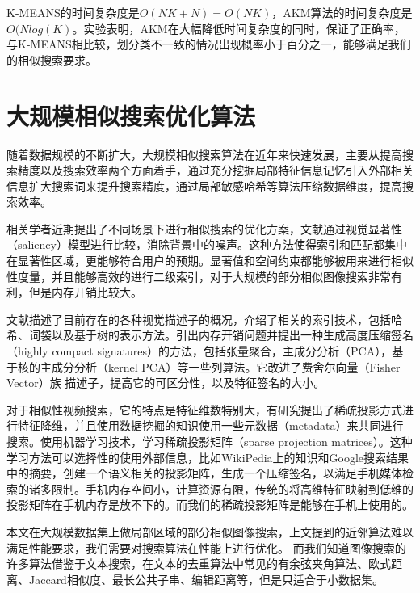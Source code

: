 K-MEANS的时间复杂度是\(O(NK+N) = O(NK)\)，AKM算法的时间复杂度是\(O(Nlog(K)\)。实验表明，AKM在大幅降低时间复杂度的同时，保证了正确率，与K-MEANS相比较，划分类不一致的情况出现概率小于百分之一，能够满足我们的相似搜索要求。




\section{大规模相似搜索优化算法}

随着数据规模的不断扩大，大规模相似搜索算法在近年来快速发展，主要从提高搜索精度以及搜索效率两个方面着手，通过充分挖掘局部特征信息记忆引入外部相关信息扩大搜索词来提升搜索精度，通过局部敏感哈希等算法压缩数据维度，提高搜索效率\cite{POLICY:2013te}。

相关学者近期提出了不同场景下进行相似搜索的优化方案，文献\cite{Li:2013ks}通过视觉显著性（saliency）模型进行比较，消除背景中的噪声。这种方法使得索引和匹配都集中在显著性区域，更能够符合用户的预期。显著值和空间约束都能够被用来进行相似性度量，并且能够高效的进行二级索引，对于大规模的部分相似图像搜索非常有利，但是内存开销比较大。

文献\cite{Negrel:2013ur}描述了目前存在的各种视觉描述子的概况，介绍了相关的索引技术，包括哈希、词袋以及基于树的表示方法。引出内存开销问题并提出一种生成高度压缩签名（highly compact signatures）的方法，包括张量聚合，主成分分析（PCA），基于核的主成分分析（kernel PCA）等一些列算法。它改进了费舍尔向量（Fisher Vector）族 描述子，提高它的可区分性，以及特征签名的大小。

对于相似性视频搜索，它的特点是特征维数特别大，有研究提出了稀疏投影方式进行特征降维，并且使用数据挖掘的知识使用一些元数据（metadata）来共同进行搜索\cite{Wu:2013tb}。使用机器学习技术，学习稀疏投影矩阵（sparse projection matrices）。这种学习方法可以选择性的使用外部信息，比如WikiPedia上的知识和Google搜索结果中的摘要，创建一个语义相关的投影矩阵，生成一个压缩签名，以满足手机媒体检索的诸多限制。手机内存空间小，计算资源有限，传统的将高维特征映射到低维的投影矩阵在手机内存是放不下的。而我们的稀疏投影矩阵是能够在手机上使用的。

本文在大规模数据集上做局部区域的部分相似图像搜索，上文提到的近邻算法难以满足性能要求，我们需要对搜索算法在性能上进行优化。
而我们知道图像搜索的许多算法借鉴于文本搜索，在文本的去重算法中常见的有余弦夹角算法、欧式距离、Jaccard相似度、最长公共子串、编辑距离等，但是只适合于小数据集。

